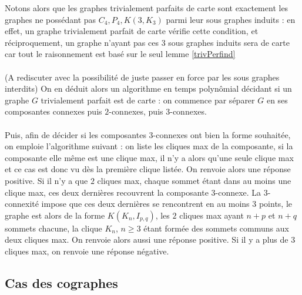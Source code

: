 \documentclass{scrartcl}
\begin{document}
\begin{flushleft}
Notons alors que les graphes trivialement parfaits de carte sont exactement les graphes ne possédant pas $C_4, P_4, K(3, K_3)$ parmi
leur sous graphes induits : en effet, un graphe trivialement parfait de carte vérifie cette condition, et réciproquement, un graphe
n'ayant pas ces $3$ sous graphes induits sera de carte car tout le raisonnement est basé sur le seul lemme \ref{trivPerfind}
\\~\\
(A rediscuter avec la possibilité de juste passer en force par les sous graphes interdits)
On en déduit alors un algorithme en temps polynômial décidant si un graphe $G$ trivialement parfait est de carte : on commence
par séparer $G$ en ses composantes connexes puis $2$-connexes, puis $3$-connexes.
\\~\\
Puis, afin de décider si les composantes $3$-connexes ont bien la forme souhaitée, on emploie l'algorithme suivant : on liste les cliques
max de la composante, si la composante elle même est une clique max, il n'y a alors qu'une seule clique max et ce cas est donc
vu dès la première clique listée. On renvoie alors une réponse positive. Si il n'y a que $2$ cliques max, chaque sommet étant
dans au moins une clique max, ces deux dernières recouvrent la composante $3$-connexe. La $3$-connexité impose que ces deux dernières
se rencontrent en au moins $3$ points, le graphe est alors de la forme $K(K_n, I_{p,q})$, les $2$ cliques max ayant $n+p$
et $n+q$ sommets chacune, la clique $K_n$, $n \geq 3$ étant formée des sommets communs aux deux cliques max. On renvoie alors
aussi une réponse positive. Si il y a plus de $3$ cliques max, on renvoie une réponse négative.

\subsection{Cas des cographes}


\end{flushleft}
\end{document}
